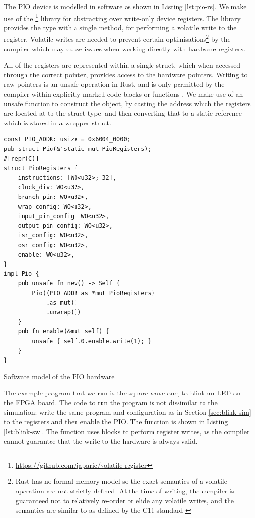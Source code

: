 The PIO device is modelled in software as shown in Listing \ref{lst:pio-rs}. We make use of the \footnote{\url{https://github.com/japaric/volatile-register}} library for abstracting over write-only device registers. The library provides the  type with a single method,  for performing a volatile write to the register. Volatile writes are needed to prevent certain optimisations\footnote{Rust has no formal memory model so the exact semantics of a volatile operation are not strictly defined. At the time of writing, the compiler is guaranteed not to relatively re-order or elide any volatile writes, and the semantics are similar to as defined by the C11 standard \cite{rust-pointer, c11}} by the compiler which may cause issues when working directly with hardware registers.

All of the registers are represented within a single struct, which when accessed through the correct pointer, provides access to the hardware pointers. Writing to raw pointers is an unsafe operation in Rust, and is only permitted by the compiler within explicitly marked  code blocks or functions \cite{rust-usability}. We make use of an unsafe function to construct the  object, by casting the address which the registers are located at to the struct type, and then converting that to a static reference which is stored in a wrapper struct.

\begin{listing}[h!]
    \begin{verbatim}
const PIO_ADDR: usize = 0x6004_0000;
pub struct Pio(&'static mut PioRegisters);
#[repr(C)]
struct PioRegisters {
    instructions: [WO<u32>; 32],
    clock_div: WO<u32>,
    branch_pin: WO<u32>,
    wrap_config: WO<u32>,
    input_pin_config: WO<u32>,
    output_pin_config: WO<u32>,
    isr_config: WO<u32>,
    osr_config: WO<u32>,
    enable: WO<u32>,
}
impl Pio {
    pub unsafe fn new() -> Self {
        Pio((PIO_ADDR as *mut PioRegisters)
            .as_mut()
            .unwrap())
    }
    pub fn enable(&mut self) {
        unsafe { self.0.enable.write(1); }
    }
}
    \end{verbatim}
    \caption{Software model of the PIO hardware}
    \label{lst:pio-rs}
\end{listing}

The example program that we run is the square wave one, to blink an LED on the FPGA board. The code to run the program is not dissimilar to the simulation: write the same program and configuration as in Section \ref{sec:blink-sim} to the registers and then enable the PIO. The function is shown in Listing \ref{lst:blink-sw}. The function uses  blocks to perform register writes, as the compiler cannot guarantee that the write to the hardware is always valid.

